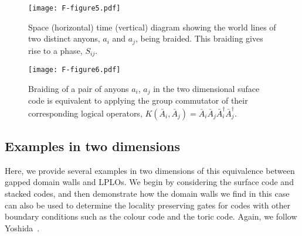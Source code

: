 \documentclass[pra,twocolumn,a4paper,nofootinbib]{revtex4-1}
\begin{document}
\begin{figure}
\centering
\texttt{[image: F-figure5.pdf]}
\caption{Space (horizontal) time (vertical) diagram showing the world lines of two distinct anyons, $a_i$ and $a_j$, being braided. This braiding gives rise to a phase, $S_{ij}$. \label{fig:Braid1}}
\end{figure}

\begin{figure}
\centering
\texttt{[image: F-figure6.pdf]}
\caption{Braiding of a pair of anyons $a_i$, $a_j$ in the two dimensional suface code is equivalent to applying the group commutator of their corresponding logical operators, $K(\bar{A}_i,\bar{A}_j) =\bar{A}_i\bar{A}_j\bar{A}_i^\dag \bar{A}_j^\dag$. \label{fig:Braid2}}
\end{figure}

\subsection{Examples in two dimensions}
\label{subsec:2Dexamples}
Here, we provide several examples in two dimensions of this equivalence between gapped domain walls and LPLOs.  We begin by considering the surface code and stacked codes, and then demonstrate how the domain walls we find in this case can also be used to determine the locality preserving gates for codes with other boundary conditions such as the colour code and the toric code.  Again, we follow Yoshida~\cite{YoshidaA}.
\end{document}
